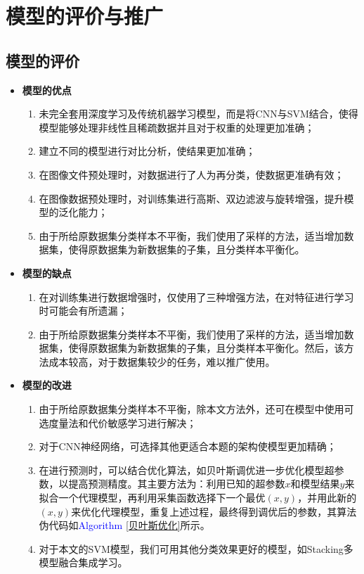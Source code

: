 \documentclass{MathorCupmodeling}
\begin{document}
	\section{模型的评价与推广}
	\subsection{模型的评价}
	\begin{itemize}
		\item \textbf{模型的优点}
		\begin{enumerate}
			\item 未完全套用深度学习及传统机器学习模型，而是将CNN与SVM结合，使得模型能够处理非线性且稀疏数据并且对于权重的处理更加准确；
			\item 建立不同的模型进行对比分析，使结果更加准确；
			\item 在图像文件预处理时，对数据进行了人为再分类，使数据更准确有效；
			\item 在图像数据预处理时，对训练集进行高斯、双边滤波与旋转增强，提升模型的泛化能力；
			\item 由于所给原数据集分类样本不平衡，我们使用了采样的方法，适当增加数据集，使得原数据集为新数据集的子集，且分类样本平衡化。
		\end{enumerate}
		\item \textbf{模型的缺点}
		\begin{enumerate}
			\item 在对训练集进行数据增强时，仅使用了三种增强方法，在对特征进行学习时可能会有所遗漏；
			\item 由于所给原数据集分类样本不平衡，我们使用了采样的方法，适当增加数据集，使得原数据集为新数据集的子集，且分类样本平衡化。然后，该方法成本较高，对于数据集较少的任务，难以推广使用。
		\end{enumerate}
		\item \textbf{模型的改进}
		\begin{enumerate}
			\item 由于所给原数据集分类样本不平衡，除本文方法外，还可在模型中使用可选度量法和代价敏感学习进行解决\textcolor{blue}{\cite{数据挖掘导论}}；
			\item 对于CNN神经网络，可选择其他更适合本题的架构使模型更加精确；
			\item 在进行预测时，可以结合优化算法，如贝叶斯调优进一步优化模型超参数，以提高预测精度。其主要方法为：利用已知的超参数$x$和模型结果$y$来拟合一个代理模型，再利用采集函数选择下一个最优$\left(x,y\right)$，并用此新的$\left(x,y\right)$来优化代理模型，重复上述过程，最终得到调优后的参数，其算法伪代码如\textcolor{blue}{Algorithm \ref{贝叶斯优化}}所示。
			\item 对于本文的SVM模型，我们可用其他分类效果更好的模型，如Stacking多模型融合集成学习。
		\end{enumerate}
	\end{itemize}
\end{document}
